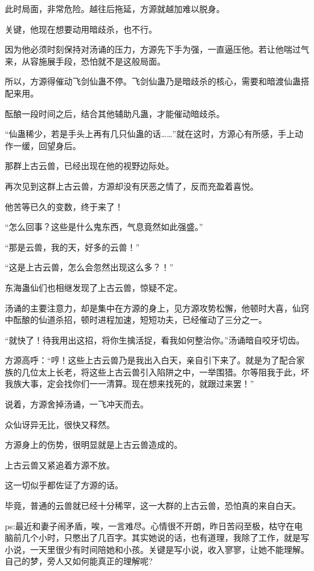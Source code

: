 \begin{this_body}
此时局面，非常危险。越往后拖延，方源就越加难以脱身。

关键，他现在想要动用暗歧杀，也不行。

因为他必须时刻保持对汤诵的压力，方源先下手为强，一直逼压他。若让他喘过气来，从容施展手段，恐怕就不是这般局面。

所以，方源得催动飞剑仙蛊不停。飞剑仙蛊乃是暗歧杀的核心，需要和暗渡仙蛊搭配来用。

酝酿一段时间之后，结合其他辅助凡蛊，才能催动暗歧杀。

“仙蛊稀少，若是手头上再有几只仙蛊的话……”就在这时，方源心有所感，手上动作一缓，回望身后。

那群上古云兽，已经出现在他的视野边际处。

再次见到这群上古云兽，方源却没有厌恶之情了，反而充盈着喜悦。

他苦等已久的变数，终于来了！

“怎么回事？这些是什么鬼东西，气息竟然如此强盛。”

“那是云兽，我的天，好多的云兽！”

“这是上古云兽，怎么会忽然出现这么多？！”

东海蛊仙们也相继发现了上古云兽，惊疑不定。

汤诵的主要注意力，却是集中在方源的身上，见方源攻势松懈，他顿时大喜，仙窍中酝酿的仙道杀招，顿时进程加速，短短功夫，已经催动了三分之一。

“就快了！待我用出这招，将你生擒活捉，看我如何整治你。”汤诵暗自咬牙切齿。

方源高呼：“哼！这些上古云兽乃是我出入白天，亲自引下来了。就是为了配合家族的几位太上长老，将这些上古云兽引入陷阱之中，一举围猎。尔等阻我于此，坏我族大事，定会找你们一一清算。现在想来找死的，就跟过来罢！”

说着，方源舍掉汤诵，一飞冲天而去。

众仙讶异无比，很快又释然。

方源身上的伤势，很明显就是上古云兽造成的。

上古云兽又紧追着方源不放。

这一切似乎都佐证了方源的话。

毕竟，普通的云兽就已经十分稀罕，这一大群的上古云兽，恐怕真的来自白天。

ps:最近和妻子闹矛盾，唉，一言难尽。心情很不开朗，昨日苦闷至极，枯守在电脑前几个小时，只憋出了几百字。其实她说的话，也有道理，我除了工作，就是写小说，一天里很少有时间陪她和小孩。关键是写小说，收入寥寥，让她不能理解。自己的梦，旁人又如何能真正的理解呢?

\end{this_body}

